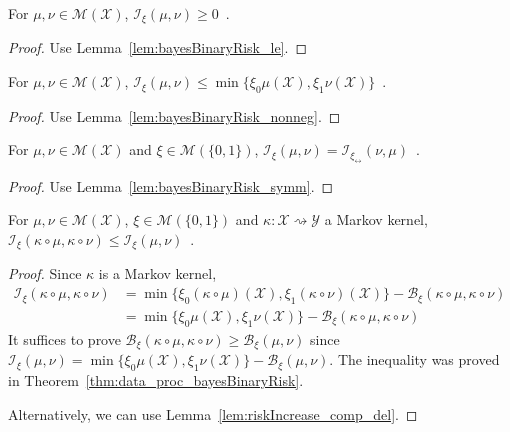 \begin{lemma}
  \label{lem:statInfo_nonneg}
  For $\mu, \nu \in \mathcal M(\mathcal X)$, $\mathcal I_\xi(\mu, \nu) \ge 0$~.
\end{lemma}

\begin{proof}%
{}
Use Lemma~\ref{lem:bayesBinaryRisk_le}.
\end{proof}


\begin{lemma}
  \label{lem:statInfo_le}
  For $\mu, \nu \in \mathcal M(\mathcal X)$, $\mathcal I_\xi(\mu, \nu) \le \min\{\xi_0 \mu(\mathcal X), \xi_1 \nu(\mathcal X)\}$~.
\end{lemma}

\begin{proof}%
{}
Use Lemma~\ref{lem:bayesBinaryRisk_nonneg}.
\end{proof}


\begin{lemma}
  \label{lem:statInfo_symm}
  For $\mu, \nu \in \mathcal M(\mathcal X)$ and $\xi \in \mathcal M(\{0,1\})$, $\mathcal I_\xi(\mu, \nu) = \mathcal I_{\xi_\leftrightarrow}(\nu, \mu)$~.
\end{lemma}

\begin{proof}%
{}
Use Lemma~\ref{lem:bayesBinaryRisk_symm}.
\end{proof}

\begin{theorem}
  \label{thm:data_proc_statInfo}
  \leanok
  For $\mu, \nu \in \mathcal M(\mathcal X)$, $\xi \in \mathcal M(\{0,1\})$ and $\kappa : \mathcal X \rightsquigarrow \mathcal Y$ a Markov kernel, $\mathcal I_\xi(\kappa \circ \mu, \kappa \circ \nu) \le \mathcal I_\xi(\mu, \nu)$~.
\end{theorem}

\begin{proof}\leanok
{}
Since $\kappa$ is a Markov kernel,
\begin{align*}
\mathcal I_\xi(\kappa \circ \mu, \kappa \circ \nu)
&= \min\{\xi_0(\kappa \circ \mu)(\mathcal X), \xi_1(\kappa \circ \nu)(\mathcal X)\} - \mathcal B_\xi(\kappa \circ \mu, \kappa \circ \nu)
\\
&= \min\{\xi_0 \mu(\mathcal X), \xi_1 \nu(\mathcal X)\} - \mathcal B_\xi(\kappa \circ \mu, \kappa \circ \nu)
\end{align*}
It suffices to prove $\mathcal B_\xi(\kappa \circ \mu, \kappa \circ \nu) \ge \mathcal B_\xi(\mu, \nu)$ since $\mathcal I_\xi(\mu, \nu) = \min\{\xi_0\mu(\mathcal X), \xi_1\nu(\mathcal X)\} - \mathcal B_\xi(\mu, \nu)$.
The inequality was proved in Theorem~\ref{thm:data_proc_bayesBinaryRisk}.

Alternatively, we can use Lemma~\ref{lem:riskIncrease_comp_del}.
\end{proof}


